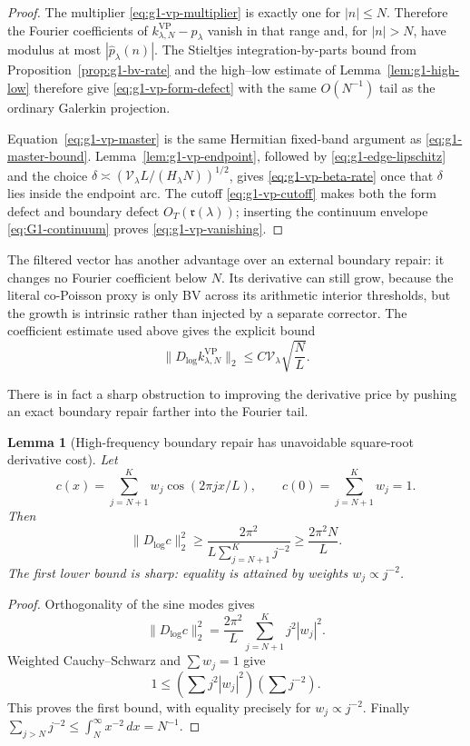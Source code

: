 \documentclass[11pt]{article}
\newtheorem{lemma}[theorem]{Lemma}
\theoremstyle{remark}
\begin{document}
\begin{proof}
The multiplier \eqref{eq:g1-vp-multiplier} is exactly one for $|n|\le N$.
Therefore the Fourier coefficients of
$k^{\mathrm{VP}}_{\lambda,N}-p_\lambda$ vanish in that range and, for
$|n|>N$, have modulus at most $|\widehat p_\lambda(n)|$.  The Stieltjes
integration-by-parts bound from Proposition~\ref{prop:g1-bv-rate} and the
high--low estimate of Lemma~\ref{lem:g1-high-low} therefore give
\eqref{eq:g1-vp-form-defect} with the same $O(N^{-1})$ tail as the ordinary
Galerkin projection.

Equation~\eqref{eq:g1-vp-master} is the same Hermitian fixed-band argument as
\eqref{eq:g1-master-bound}.  Lemma~\ref{lem:g1-vp-endpoint}, followed by
\eqref{eq:g1-edge-lipschitz} and the choice
$\delta\asymp(\mathcal V_\lambda L/(H_\lambda N))^{1/2}$, gives
\eqref{eq:g1-vp-beta-rate} once that $\delta$ lies inside the endpoint arc.
The cutoff \eqref{eq:g1-vp-cutoff} makes both the form defect and boundary
defect $O_T(\mathfrak r(\lambda))$; inserting the continuum envelope
\eqref{eq:G1-continuum} proves \eqref{eq:g1-vp-vanishing}.
\end{proof}

The filtered vector has another advantage over an external boundary repair:
it changes no Fourier coefficient below $N$.  Its derivative can still grow,
because the literal co-Poisson proxy is only BV across its arithmetic interior
thresholds, but the growth is intrinsic rather than injected by a separate
corrector.  The coefficient estimate used above gives the explicit bound
\begin{equation}\label{eq:g1-vp-derivative}
 \|D_{\log}k^{\mathrm{VP}}_{\lambda,N}\|_2
 \le C\mathcal V_\lambda\sqrt{\frac{N}{L}}.
\end{equation}

There is in fact a sharp obstruction to improving the derivative price by
pushing an exact boundary repair farther into the Fourier tail.

\begin{lemma}[High-frequency boundary repair has unavoidable square-root derivative cost]\label{lem:g1-repair-no-go}
Let
\[
 c(x)=\sum_{j=N+1}^{K}w_j\cos(2\pi jx/L),
 \qquad c(0)=\sum_{j=N+1}^{K}w_j=1.
\]
Then
\begin{equation}\label{eq:g1-repair-no-go}
 \boxed{
 \|D_{\log}c\|_2^2
 \ge
 \frac{2\pi^2}{L\displaystyle\sum_{j=N+1}^{K}j^{-2}}
 \ge\frac{2\pi^2N}{L}.}
\end{equation}
The first lower bound is sharp: equality is attained by weights
$w_j\propto j^{-2}$.
\end{lemma}
\begin{proof}
Orthogonality of the sine modes gives
\[
 \|D_{\log}c\|_2^2
 =\frac{2\pi^2}{L}\sum_{j=N+1}^{K}j^2|w_j|^2.
\]
Weighted Cauchy--Schwarz and $\sum w_j=1$ give
\[
 1\le
 \left(\sum j^2|w_j|^2\right)
 \left(\sum j^{-2}\right).
\]
This proves the first bound, with equality precisely for $w_j\propto j^{-2}$.
Finally
$\sum_{j>N}j^{-2}\le\int_N^\infty x^{-2}\,dx=N^{-1}$.
\end{proof}
\end{document}
